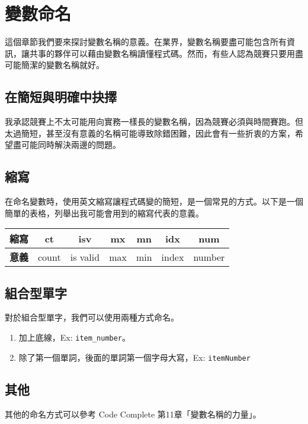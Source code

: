 \section{變數命名}
    這個章節我們要來探討變數名稱的意義。在業界，變數名稱要盡可能包含所有資訊，讓共事的夥伴可以藉由變數名稱讀懂程式碼。然而，有些人認為競賽只要用盡可能簡潔的變數名稱就好。

    \subsection{在簡短與明確中抉擇}
    我承認競賽上不太可能用向實務一樣長的變數名稱，因為競賽必須與時間賽跑。但太過簡短，甚至沒有意義的名稱可能導致除錯困難，因此會有一些折衷的方案，希望盡可能同時解決兩邊的問題。

    \subsection{縮寫}
    在命名變數時，使用英文縮寫讓程式碼變的簡短，是一個常見的方式。以下是一個簡單的表格，列舉出我可能會用到的縮寫代表的意義。
    \begin{center}
        \begin{tabular}{c|c|c|c|c|c|c}
             \textbf{縮寫} & ct  & isv & mx & mn & idx & num \\
             \hline
             \textbf{意義} & count & is valid & max & min & index & number
        \end{tabular}
    \end{center}
    

    \subsection{組合型單字}
    對於組合型單字，我們可以使用兩種方式命名。

    \begin{enumerate}
        \item 加上底線，Ex: \verb|item_number|。
        \item 除了第一個單詞，後面的單詞第一個字母大寫，Ex: \verb|itemNumber|
    \end{enumerate}

    \subsection{其他}
    其他的命名方式可以參考 Code Complete 第11章「變數名稱的力量」。